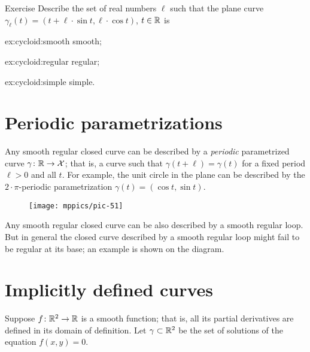 \begin{thm}{Exercise}\label{ex:cycloid}
Describe the set of real numbers $\ell$
such that the plane curve $\gamma_\ell (t)= (t+\ell \cdot \sin t,\ell \cdot \cos t)$, $t\in\mathbb{R}$ is

\begin{subthm}{ex:cycloid:smooth}
smooth; %
\end{subthm}

\begin{subthm}{ex:cycloid:regular}
regular;
\end{subthm}

\begin{subthm}{ex:cycloid:simple}
simple.
\end{subthm}

\end{thm}

\section{Periodic parametrizations}

Any smooth regular closed curve can be described by a \emph{periodic} parametrized curve $\gamma\colon \mathbb{R}\to \mathcal{X}$; that is, a curve such that $\gamma(t+\ell)=\gamma(t)$ for a fixed period $\ell > 0$ and all $t$.
For example, the unit circle in the plane can be described by the $2{\cdot}\pi$-periodic parametrization $\gamma(t)=(\cos t,\sin t)$.

{

\begin{wrapfigure}{o}{17 mm}
\vskip-0mm
\centering
\texttt{[image: mppics/pic-51]}
\end{wrapfigure}

Any smooth regular closed curve can be also described by a smooth regular loop.
But in general the closed curve described by a smooth regular loop might fail to be regular at its base; an example is shown on the diagram.

}

\section{Implicitly defined curves}

Suppose $f\colon\mathbb{R}^2\to \mathbb{R}$ is a smooth function; 
that is, all its partial derivatives are defined in its domain of definition.
Let $\gamma\subset \mathbb{R}^2$ be the set of solutions of the equation $f(x,y)=0$.

